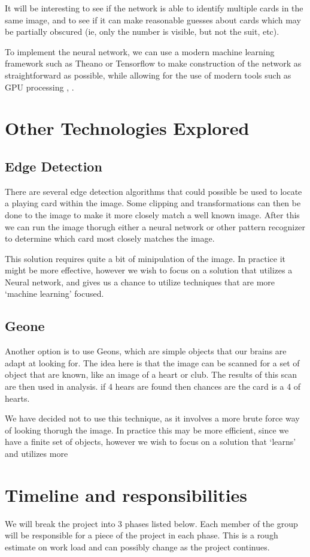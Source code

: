 \documentclass{article}
\begin{document}
It will be interesting to see if the network is able to identify multiple cards in the same image, and to see if it can make reasonable guesses about cards which may be partially obscured (ie, only the number is visible, but not the suit, etc).

To implement the neural network, we can use a modern machine learning framework such as Theano or Tensorflow to make construction of the network as straightforward as possible, while allowing for the use of modern tools such as GPU processing \cite{gpu2}, \cite{gpu}.


\section{Other Technologies Explored}
\subsection{Edge Detection}
There are several edge detection algorithms that could possible be used to locate a playing card within the image.  Some clipping and transformations can then be done to the image to make it more closely match a well known image.  After this we can run the image thorugh either a neural network or other pattern recognizer to determine which card most closely matches the image.

This solution requires quite a bit of minipulation of the image.  In practice it might be more effective, however we wish to focus on a solution that utilizes a Neural network, and gives us a chance to utilize techniques that are more `machine learning' focused.

\subsection{Geone}
Another option is to use Geons, which are simple objects that our brains are adapt at looking for.  The idea here is that the image can be scanned for a set of object that are known, like an image of a heart or club.  The results of this scan are then used in analysis.  if 4 hears are found then chances are the card is a 4 of hearts.

We have decided not to use this technique, as it involves a more brute force way of looking thorugh the image.  In practice this may be more efficient, since we have a finite set of objects, however we wish to focus on a solution that `learns' and utilizes more 

\section{Timeline and responsibilities}
We will break the project into 3 phases listed below.  Each member of the group will be responsible for a piece of the project in each phase.  This is a rough estimate on work load and can possibly change as the project continues.
\end{document}

